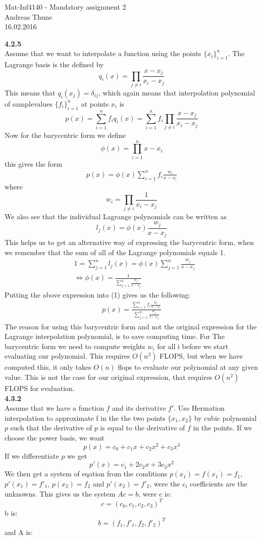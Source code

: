 \documentclass[11pt,a4paper]{report}
\begin{document}
\begin{center}

\LARGE Mat-Inf4140 - Mandatory assignment 2
\\
Andreas Thune
\\
\LARGE
16.02.2016

\end{center}
\textbf{4.2.5}
\\
Assume that we want to interpolate a function using the points $\{ x_i\}_{i=1}^n$. The Lagrange basis is the defined by $$q_i(x) = \prod_{j\neq i} \frac{x-x_j}{x_i-x_j} $$ This means that $q_i(x_j) = \delta_{ij}$, which again means that interpolation polynomial of samplevalues $\{ f_i\}_{i=1}^n$ at points $x_i$ is $$p(x) = \sum_{i=1}^n f_iq_i(x)= \sum_{i=1}^n f_i\prod_{j\neq i} \frac{x-x_j}{x_i-x_j}$$ Now for the barycentric form we define $$\phi(x) = \prod_{i=1}^n x-x_i $$ this gives the form 
\begin{align}
p(x) = \phi(x)\sum_{i=1}^n f_i\frac{w_i}{x-x_i} 
\end{align}
where $$w_i = \prod_{j\neq i} \frac{1}{x_i-x_j}$$
We also see that the individual Lagrange polynomials can be written as $$l_j(x)=\phi(x)\frac{w_j}{x-x_j} $$ This helps us to get an alternative way of expressing the barycentric form, when we remember that the sum of all of the Lagrange polynomials equals 1. 
\begin{align*}
&1=\sum_{j=1}^n l_j(x)= \phi(x)\sum_{j=1}^n \frac{w_j}{x-x_j} \\
&\iff \phi(x) = \frac{1}{\sum_{j=1}^n \frac{w_j}{x-x_j}}
\end{align*} 
Putting the above expression into (1) gives us the following:
\begin{align*}
p(x)=\frac{\sum_{i=1}^n f_i\frac{w_i}{x-x_i}}{\sum_{j=1}^n \frac{w_j}{x-x_j}}
\end{align*}
The reason for using this barycentric form and not the original expression for the Lagrange interpolation polynomial, is to save computing time. For The barycentric form we need to compute weights $w_i$ for all i before we start evaluating our polynomial. This requires $O(n^2)$ FLOPS, but when we have computed this, it only takes $O(n)$ flops to evaluate our polynomial at any given value. This is not the case for our original expression, that requires $O(n^2)$ FLOPS for evaluation. 
\\
\textbf{4.3.2}
\\
Assume that we have a function $f$ and its derivative $f'$. Use Hermation interpolation to approximate f in the the two points $\{x_1,x_2\}$ by cubic polynomial $p$ such that the derivative of $p$ is equal to the derivative of $f$ in the points. If we choose the power basis, we want $$p(x)=c_0 + c_1x + c_2x^2 + c_3x^3$$ If we differentiate $p$ we get $$p'(x)=c_1 + 2c_2x + 3c_3x^2$$ We then get a system of eqation from the conditions $p(x_1)=f(x_1)=f_1$, $p'(x_1)=f'_1$, $p(x_2)=f_2$ and $p'(x_2)=f'_2$, were the $c_i$ coefficients are the unknowns. This gives us the system $Ac=b$, were c is: $$c=(c_0,c_1,c_2,c_3)^T$$ b is: $$b=(f_1,f'_1,f_2,f'_2)^T$$ and A is:  
\end{document}
